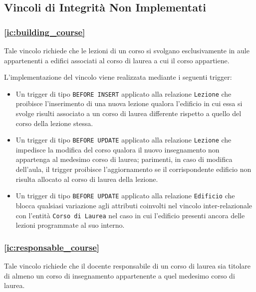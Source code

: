 \documentclass[a4paper,11pt]{article}
\begin{document}
\subsection{Vincoli di Integrità Non Implementati}

\subsubsection{\ref{ic:building_course}}

Tale vincolo richiede che le lezioni di un corso si svolgano esclusivamente in aule appartenenti a edifici associati al corso di laurea a cui il corso appartiene.

L'implementazione del vincolo viene realizzata mediante i seguenti trigger:
\begin{itemize}
    \item Un trigger di tipo \texttt{BEFORE INSERT} applicato alla relazione \texttt{Lezione} che proibisce l'inserimento di una nuova lezione qualora l'edificio in cui essa si svolge risulti associato a un corso di laurea differente rispetto a quello del corso della lezione stessa.
    \item Un trigger di tipo \texttt{BEFORE UPDATE} applicato alla relazione \texttt{Lezione} che impedisce la modifica del corso qualora il nuovo insegnamento non appartenga al medesimo corso di laurea; parimenti, in caso di modifica dell'aula, il trigger proibisce l'aggiornamento se il corrispondente edificio non risulta allocato al corso di laurea della lezione.
    \item Un trigger di tipo \texttt{BEFORE UPDATE} applicato alla relazione \texttt{Edificio} che blocca qualsiasi variazione agli attributi coinvolti nel vincolo inter-relazionale con l'entità \texttt{Corso di Laurea} nel caso in cui l'edificio presenti ancora delle lezioni programmate al suo interno.
\end{itemize}

\subsubsection{\ref{ic:responsable_course}}

Tale vincolo richiede che il docente responsabile di un corso di laurea sia titolare di almeno un corso di insegnamento appartenente a quel medesimo corso di laurea.
\end{document}

